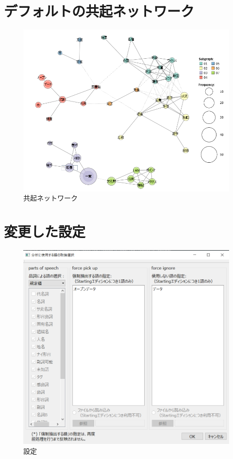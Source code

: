 \documentclass[a4paper,11pt]{ltjsarticle}
\begin{document}
\section{デフォルトの共起ネットワーク}
\begin{figure}[htbp]
    \centering
    \includegraphics[width=\columnwidth]{image/net.png}
    \caption{共起ネットワーク}
    \label{fig:net}
\end{figure}
\newpage
\section{変更した設定}
\begin{figure}[htbp]
    \centering
    \includegraphics[width = \columnwidth]{image/config.png}
    \caption{設定}
    \label{fig:config}
\end{figure}
\newpage
\end{document}
